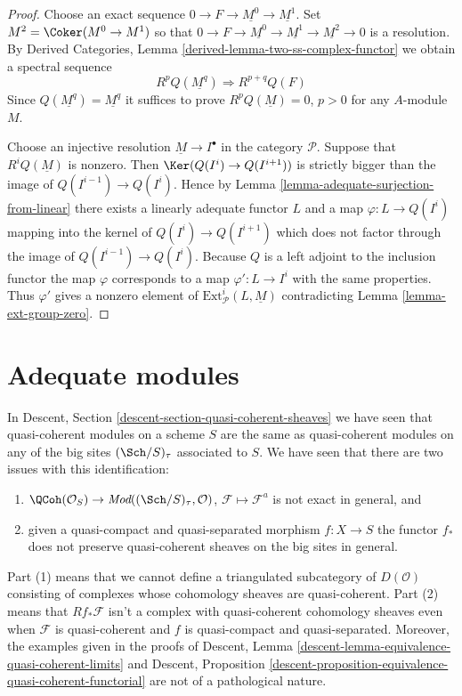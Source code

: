 \begin{proof}
Choose an exact sequence $0 \to F \to \underline{M^0} \to \underline{M^1}$.
Set $M^2 = \Coker(M^0 \to M^1)$ so that
$0 \to F \to \underline{M^0} \to \underline{M^1}
\to \underline{M^2} \to 0$ is a resolution. By
Derived Categories, Lemma \ref{derived-lemma-two-ss-complex-functor}
we obtain a spectral sequence
$$
R^pQ(\underline{M^q}) \Rightarrow R^{p + q}Q(F)
$$
Since $Q(\underline{M^q}) = \underline{M^q}$ it suffices to prove
$R^pQ(\underline{M}) = 0$, $p > 0$ for any $A$-module $M$.

\medskip\noindent
Choose an injective resolution $\underline{M} \to I^\bullet$ in
the category $\mathcal{P}$. Suppose that $R^iQ(\underline{M})$ is nonzero.
Then $\Ker(Q(I^i) \to Q(I^{i + 1}))$ is strictly bigger
than the image of $Q(I^{i - 1}) \to Q(I^i)$. Hence by
Lemma \ref{lemma-adequate-surjection-from-linear}
there exists a linearly adequate functor $L$ and a map
$\varphi : L \to Q(I^i)$ mapping into the kernel of $Q(I^i) \to Q(I^{i + 1})$
which does not factor through the image of $Q(I^{i - 1}) \to Q(I^i)$.
Because $Q$ is a left adjoint to the inclusion functor the map
$\varphi$ corresponds to a map $\varphi' : L \to I^i$ with the same properties.
Thus $\varphi'$ gives a nonzero element of
$\text{Ext}^i_\mathcal{P}(L, \underline{M})$ contradicting
Lemma \ref{lemma-ext-group-zero}.
\end{proof}














\section{Adequate modules}
\label{section-adequate}

\noindent
In
Descent, Section \ref{descent-section-quasi-coherent-sheaves}
we have seen that quasi-coherent modules on a scheme $S$
are the same as quasi-coherent modules on any of the big
sites $(\Sch/S)_\tau$ associated to $S$. We have seen that there
are two issues with this identification:
\begin{enumerate}
\item $\QCoh(\mathcal{O}_S) \to
\textit{Mod}((\Sch/S)_\tau, \mathcal{O})$,
$\mathcal{F} \mapsto \mathcal{F}^a$ is not exact in general, and
\item given a quasi-compact and quasi-separated morphism $f : X \to S$
the functor $f_*$ does not preserve quasi-coherent sheaves on the
big sites in general.
\end{enumerate}
Part (1) means that we cannot define a triangulated subcategory
of $D(\mathcal{O})$ consisting of complexes whose cohomology sheaves
are quasi-coherent. Part (2) means that $Rf_*\mathcal{F}$ isn't a
complex with quasi-coherent cohomology sheaves even when $\mathcal{F}$
is quasi-coherent and $f$ is quasi-compact and quasi-separated.
Moreover, the examples given in the proofs of
Descent, Lemma
\ref{descent-lemma-equivalence-quasi-coherent-limits}
and
Descent, Proposition
\ref{descent-proposition-equivalence-quasi-coherent-functorial}
are not of a pathological nature.

